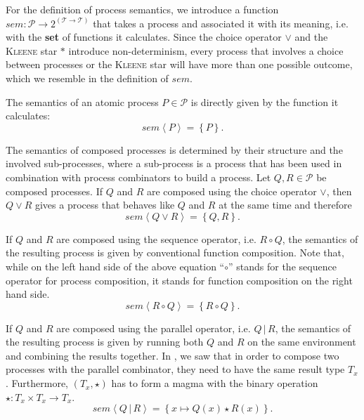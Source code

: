 For the definition of process semantics, we introduce a function $sem \colon \mathcal{P} \to 2^{\left( \mathcal{T} \to \mathcal{T} \right)}$ that takes a process and associated it with its meaning, i.e. with the \textbf{set} of functions it calculates. Since the choice operator $\vee$ and the \textsc{Kleene} star $*$ introduce non-determinism, every process that involves a choice between processes or the \textsc{Kleene} star will have more than one possible outcome, which we resemble in the definition of $sem$.

The semantics of an atomic process $P \in \mathcal{P}$ is directly given by the function it calculates:
\begin{equation}
  \label{eqn:sem_atomic}
  sem \left\langle P \right\rangle = \left\{ P \right\}.
\end{equation}

The semantics of composed processes is determined by their structure and the involved sub-processes, where a sub-process is a process that has been used in combination with process combinators to build a process. Let $Q, R \in \mathcal{P}$ be composed processes. If $Q$ and $R$ are composed using the choice operator $\vee$, then $Q \vee R$ gives a process that behaves like $Q$ and $R$ at the same time and therefore
\begin{equation}
  \label{eqn:sem_choice}
  sem \left\langle Q \vee R \right\rangle = \left\{ Q, R \right\}.
\end{equation}

If $Q$ and $R$ are composed using the sequence operator, i.e. $R \circ Q$, the semantics of the resulting process is given by conventional function composition. Note that, while on the left hand side of the above equation \enquote{$\circ$} stands for the sequence operator for process composition, it stands for function composition on the right hand side.
\begin{equation}
  \label{eqn:sem_sequence}
  sem \left\langle R \circ Q \right\rangle = \left\{ R \circ Q \right\}.
\end{equation}

If $Q$ and $R$ are composed using the parallel operator, i.e. $Q \,|\, R$, the semantics of the resulting process is given by running both $Q$ and $R$ on the same environment and combining the results together. In , we saw that in order to compose two processes with the parallel combinator, they need to have the same result type $T_x$. Furthermore, $\left( T_x, \star \right)$ has to form a magma with the binary operation $\star \colon T_x \times T_x \to T_x$.
\begin{equation}
  \label{eqn:sem_parallel}
  sem \left\langle Q \,|\, R \right\rangle = \left\{ x \mapsto Q \left( x \right) \star R \left( x \right) \right\}.
\end{equation}

